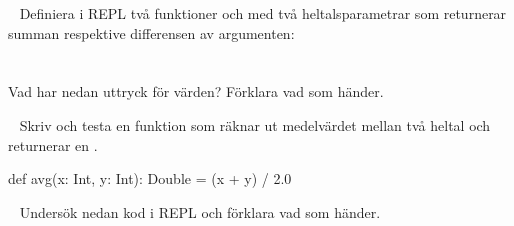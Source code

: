 \ExtraTasks %




\QUESTBEGIN

\Task  \what~  Definiera i REPL två funktioner  och  med två heltalsparametrar som returnerar summan respektive differensen av argumenten: \\
 \\
 \\
Vad har nedan uttryck för värden? Förklara vad som händer.

\Subtask {}

\Subtask {}

\Subtask {}

\Subtask {}

\SOLUTION

\TaskSolved \what

\SubtaskSolved  {}

\SubtaskSolved  {}

\SubtaskSolved  {}

\SubtaskSolved  {}

\QUESTEND






\QUESTBEGIN

\Task  \what~ Skriv och testa en funktion  som räknar ut medelvärdet mellan två heltal och returnerar en .

\SOLUTION

\TaskSolved \what

\begin{Code}
def avg(x: Int, y: Int): Double = (x + y) / 2.0
\end{Code}


\QUESTEND






\AdvancedTasks %



\QUESTBEGIN

\Task  \what~ Undersök nedan kod i REPL och förklara vad som händer.

